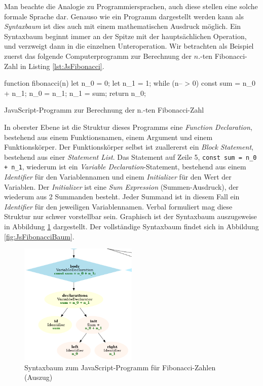 Man beachte die Analogie zu Programmiersprachen, auch diese stellen eine solche formale Sprache dar. Genauso wie ein Programm dargestellt werden kann als \emph{Syntaxbaum} ist dies auch mit einem mathematischen Ausdruck möglich. Ein Syntaxbaum beginnt immer an der Spitze mit der hauptsächlichen Operation, und verzweigt dann in die einzelnen Unteroperation. Wir betrachten als Beispiel zuerst das folgende Computerprogramm zur Berechnung der $n$.-ten Fibonacci-Zahl in Listing \ref{lst:JsFibonacci}.

\begin{listing}
\begin{jscode}
function fibonacci(n) {
	let n_0 = 0;
	let n_1 = 1;
	while (n-- > 0) {
		const sum = n_0 + n_1;
		n_0 = n_1;
		n_1 = sum;
	}
	return n_0;
}
\end{jscode}
\caption[Code Fibonacci-Zahl-Programm]{JavaScript-Programm zur Berechnung der n.-ten Fibonacci-Zahl}
\label{lst:JsFibonacci}
\end{listing}


In oberster Ebene ist die Struktur dieses Programms eine \emph{Function Declaration}, bestehend aus einem Funktionsnamen, einem Argument und einem Funktionskörper. Der Funktionskörper selbst ist zuallererst ein \emph{Block Statement}, bestehend aus einer \emph{Statement List}. Das Statement auf Zeile 5, \lstinline{const sum = n_0 + n_1}, wiederum ist ein \emph{Variable Declaration}-Statement, bestehend aus einem \emph{Identifier} für den Variablennamen und einem \emph{Initializer} für den Wert der Variablen. Der \emph{Initializer} ist eine \emph{Sum Expression} (Summen-Ausdruck), der wiederum aus 2 Summanden besteht. Jeder Summand ist in diesem Fall ein \emph{Identifier} für den jeweiligen Variablennamen. Verbal formuliert mag diese Struktur nur schwer vorstellbar sein. Graphisch ist der Syntaxbaum auszugsweise in Abbildung \ref{fig:JsFibonacciBaumPart} dargestellt. Der vollständige Syntaxbaum findet sich in Abbildung \ref{fig:JsFibonacciBaum}.

\begin{figure}
	\centering
	\includegraphics[width=0.5\textwidth]{./img/js-tree-fibonacci-part.png}
	\caption[Syntaxbaum Fibonacci-Zahl-Programm]{Syntaxbaum zum JavaScript-Programm für Fibonacci-Zahlen (Auszug)}
	\label{fig:JsFibonacciBaumPart}
\end{figure}

